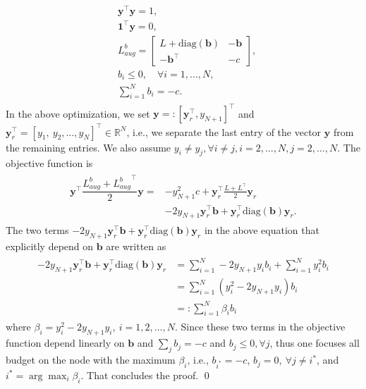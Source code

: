 \documentclass[%
 reprint,
 amsmath,amssymb,
 aip,
]{revtex4-2}
\def \by {\pmb{y}}
\def \bb {\pmb{b}}
\def \bone {\pmb{1}}
\def \diag {\text{diag}}
\theoremstyle{italichead}
\theoremstyle{definition}
\begin{document}
{\begin{align}
\begin{split}
            & \by^\top \by = 1 , \\
            & \bone^\top \by = 0, \\
            & {L_{aug}^b} = \begin{bmatrix}
                L + \text{diag}(\bb) & -\bb \\
                -\bb^\top & -c
            \end{bmatrix}, \\
            & b_i \leq 0, \quad \forall i = 1, \hdots, N,\\
            & \sum_{i=1}^N b_i = -c.
        \end{split}
        \end{align}
In the above optimization, we set $\by = : [\by_r^\top, y_{N+1}]^\top$ and $\by_r^\top = [y_1, \ y_2, \hdots, y_N]^\top \in \mathbb{R}^N$, i.e., we separate the last entry of the vector $\by$ from the remaining entries.
We also assume $y_i \neq y_j, \forall i\neq j, i= 2, \hdots, N, j = 2, \hdots, N.$
The objective function is
\begin{align}
\begin{split}
    \by^\top \dfrac{{L_{aug}^b}+{L_{aug}^b}^\top}{2} \by = & -y_{N+1}^2 c+ \by_r^\top \frac{L+L^\top}{2} \by_r \\ 
    &  -2y_{N+1} \by_r^\top \bb +\by_r^\top \diag(\bb) \by_r.
\end{split}
\end{align}
The two terms $-2y_{N+1} \by_r^\top \bb +\by_r^\top \diag(\bb) \by_r$ in the above equation that explicitly depend on $\bb$ are written as
\begin{align}
\begin{split}
    -2y_{N+1} \by_r^\top \bb + \by_r^\top \diag(\bb) \by_r & = \sum_{i=1}^N -2 y_{N+1} y_i b_i  + \sum_{i=1}^N y_i^2 b_i \\
    & = \sum_{i=1}^N \left( y_i^2 -2 y_{N+1} y_i  \right) b_i \\
    & =: \sum_{i=1}^N \beta_i b_i
\end{split}
\end{align}
where $\beta_i =  y_i^2 -2 y_{N+1} y_i, \ i = 1, 2, \hdots, N$.
Since these two terms in the objective function depend linearly on $\bb$ and $\sum_j b_j = -c$ and $b_j \leq 0, \forall j$, thus one focuses all budget on the node with the maximum $\beta_i$, i.e., $b_{i^*} = -c$, $b_j = 0, \ \forall j \neq i^*$, and $i^* = \arg \max_i \beta_i$. 
That concludes the proof. \hfill \qed

}
\end{document}
